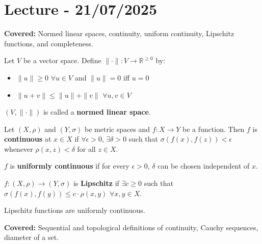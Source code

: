 \documentclass{functionspaces}
\begin{document}
\maketitlepage

\clearpage
\tableofcontents
\clearpage

\newpage
\section{Lecture - 21/07/2025}

\textbf{Covered:} Normed linear spaces, continuity, uniform continuity, Lipschitz functions, and completeness.

\begingroup
\setlength{\parskip}{6pt}
\setlength{\parindent}{0pt}

\begin{definition}
Let $V$ be a vector space. Define $\|\cdot\|:V \to \mathbb{R}^{\geq 0}$ by:
\begin{itemize}
\item $\|u\| \geq 0$ $\forall u \in V$ and $\|u\| = 0$ iff $u = 0$
\item $\|u + v\| \leq \|u\| + \|v\|$ $\forall u,v \in V$
\end{itemize}
$(V,\|\cdot\|)$ is called a \textbf{normed linear space}.
\end{definition}

\begin{definition}[Continuity]
Let $(X,\rho)$ and $(Y,\sigma)$ be metric spaces and $f:X \to Y$ be a function. Then $f$ is \textbf{continuous} at $x \in X$ if $\forall \epsilon > 0$, $\exists \delta > 0$ such that $\sigma(f(x),f(z)) < \epsilon$ whenever $\rho(x,z) < \delta$ for all $z \in X$.
\end{definition}

\begin{definition}
$f$ is \textbf{uniformly continuous} if for every $\epsilon > 0$, $\delta$ can be chosen independent of $x$.
\end{definition}

\begin{definition}
$f:(X,\rho) \to (Y,\sigma)$ is \textbf{Lipschitz} if $\exists c \geq 0$ such that $\sigma(f(x),f(y)) \leq c \cdot \rho(x,y)$ $\forall x,y \in X$.
\end{definition}

\begin{example}
Lipschitz functions are uniformly continuous.
\end{example}

\textbf{Covered:} Sequential and topological definitions of continuity, Cauchy sequences, diameter of a set.
\end{document}

